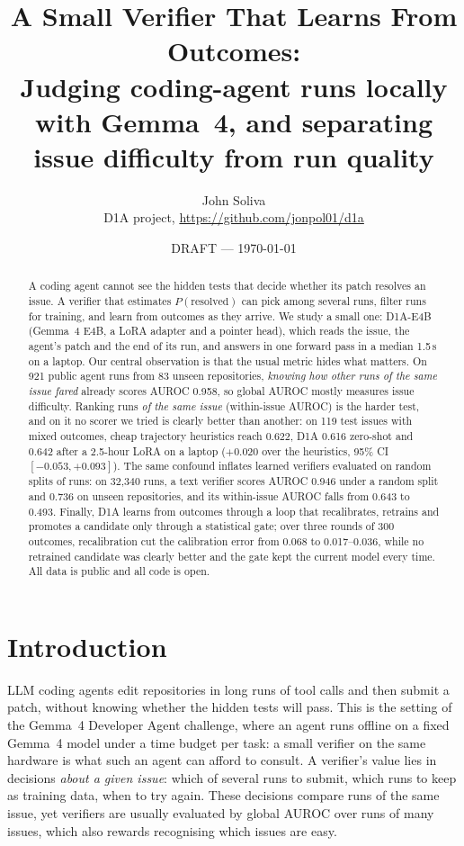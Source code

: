 \documentclass[11pt]{article}
\title{A Small Verifier That Learns From Outcomes:\\
\large Judging coding-agent runs locally with Gemma~4, and separating issue difficulty from run quality}
\author{John Soliva\\\small D1A project, \url{https://github.com/jonpol01/d1a}}
\date{DRAFT --- \today}
\begin{document}
\maketitle

\begin{abstract}
A coding agent cannot see the hidden tests that decide whether its patch resolves an issue. A verifier that estimates
$P(\text{resolved})$ can pick among several runs, filter runs for training, and learn from outcomes as they arrive.
We study a small one: D1A-E4B (Gemma~4 E4B, a LoRA adapter and a pointer head), which reads the issue, the agent's patch and the end of its run,
and answers in one forward pass in a median 1.5\,s on a laptop.
Our central observation is that the usual metric hides what matters. On 921 public agent runs from 83 unseen repositories,
\emph{knowing how other runs of the same issue fared} already scores AUROC 0.958, so global AUROC mostly measures issue difficulty.
Ranking runs \emph{of the same issue} (within-issue AUROC) is the harder test, and on it no scorer we tried is clearly better than another: on 119 test issues
with mixed outcomes, cheap trajectory heuristics reach 0.622, D1A 0.616 zero-shot and 0.642 after a 2.5-hour LoRA on a laptop
($+0.020$ over the heuristics, 95\% CI $[-0.053, +0.093]$).
The same confound inflates learned verifiers evaluated on random splits of runs: on 32{,}340 runs, a text verifier scores AUROC 0.946 under a random split
and 0.736 on unseen repositories, and its within-issue AUROC falls from 0.643 to 0.493.
Finally, D1A learns from outcomes through a loop that recalibrates, retrains and promotes a candidate only through a statistical gate;
over three rounds of 300 outcomes, recalibration cut the calibration error from 0.068 to 0.017--0.036, while no retrained candidate was clearly better and
the gate kept the current model every time.
All data is public and all code is open.
\end{abstract}

\section{Introduction}
LLM coding agents edit repositories in long runs of tool calls and then submit a patch, without knowing whether the hidden tests will pass.
This is the setting of the Gemma~4 Developer Agent challenge, where an agent runs offline on a fixed Gemma~4 model under a time budget per task:
a small verifier on the same hardware is what such an agent can afford to consult.
A verifier's value lies in decisions \emph{about a given issue}: which of several runs to submit, which runs to keep as training data, when to try again.
These decisions compare runs of the same issue, yet verifiers are usually evaluated by global AUROC over runs of many issues, which also rewards
recognising which issues are easy.
\end{document}
